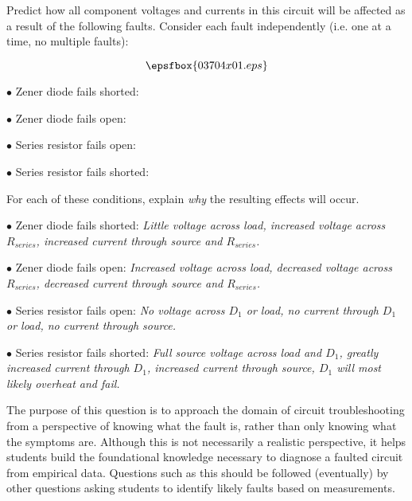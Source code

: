 

Predict how all component voltages and currents in this circuit will be affected as a result of the following faults.  Consider each fault independently (i.e. one at a time, no multiple faults):

$$\epsfbox{03704x01.eps}$$

\medskip
\item{$\bullet$} Zener diode fails shorted:
\vskip 5pt
\item{$\bullet$} Zener diode fails open:
\vskip 5pt
\item{$\bullet$} Series resistor fails open:
\vskip 5pt
\item{$\bullet$} Series resistor fails shorted:
\medskip

For each of these conditions, explain {\it why} the resulting effects will occur.







\medskip
\item{$\bullet$} Zener diode fails shorted: {\it Little voltage across load, increased voltage across $R_{series}$, increased current through source and $R_{series}$.}
\vskip 5pt
\item{$\bullet$} Zener diode fails open: {\it Increased voltage across load, decreased voltage across $R_{series}$, decreased current through source and $R_{series}$.}
\vskip 5pt
\item{$\bullet$} Series resistor fails open: {\it No voltage across $D_1$ or load, no current through $D_1$ or load, no current through source.}
\vskip 5pt
\item{$\bullet$} Series resistor fails shorted: {\it Full source voltage across load and $D_1$, greatly increased current through $D_1$, increased current through source, $D_1$ will most likely overheat and fail.}
\medskip







The purpose of this question is to approach the domain of circuit troubleshooting from a perspective of knowing what the fault is, rather than only knowing what the symptoms are.  Although this is not necessarily a realistic perspective, it helps students build the foundational knowledge necessary to diagnose a faulted circuit from empirical data.  Questions such as this should be followed (eventually) by other questions asking students to identify likely faults based on measurements.




